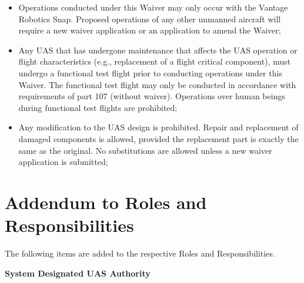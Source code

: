 \documentclass[
]{book}
\providecommand{\tightlist}{%
  \setlength{\itemsep}{0pt}\setlength{\parskip}{0pt}}
\begin{document}
\begin{itemize}
\tightlist
\item
  Operations conducted under this Waiver may only occur with the Vantage Robotics Snap. Proposed operations of any other unmanned aircraft will require a new waiver application or an application to amend the Waiver;
\item
  Any UAS that has undergone maintenance that affects the UAS operation or flight characteristics (e.g., replacement of a flight critical component), must undergo a functional test flight prior to conducting operations under this Waiver. The functional test flight may only be conducted in accordance with requirements of part 107 (without waiver). Operations over human beings during functional test flights are prohibited;
\item
  Any modification to the UAS design is prohibited. Repair and replacement of damaged components is allowed, provided the replacement part is exactly the same as the original. No substitutions are allowed unless a new waiver application is submitted;
\end{itemize}

\hypertarget{s39v-rr}{%
\section{Addendum to Roles and Responsibilities}\label{s39v-rr}}

The following items are added to the respective Roles and Responsibilities.

\textbf{System Designated UAS Authority}
\end{document}

